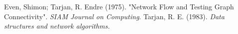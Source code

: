 \begin{thebibliography}{999}
	 Even, Shimon; Tarjan, R. Endre (1975).
	"Network Flow and Testing Graph Connectivity".
    \emph{SIAM Journal on Computing}.
     Tarjan, R. E. (1983).
    \emph{Data structures and network algorithms.}
\end{thebibliography}
